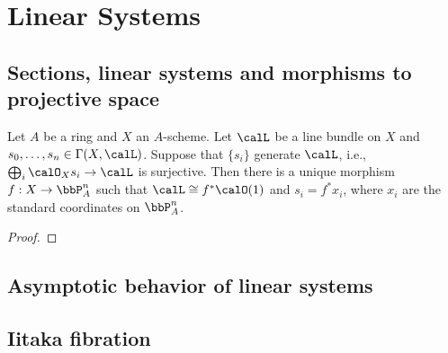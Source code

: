\section{Linear Systems}


\subsection{Sections, linear systems and morphisms to projective space}

    \begin{theorem}\label{thm:morphism_to_projective_space}
        Let \(A\) be a ring and \(X\) an \(A\)-scheme.
        Let \(\calL\) be a line bundle on \(X\) and \(s_0,\ldots,s_n\in\Gamma(X,\calL)\).
        Suppose that \(\{s_i\}\) generate \(\calL\), i.e., \(\bigoplus_i \calO_X s_i \to \calL\) is surjective.
        Then there is a unique morphism \(f:X\to \bbP^n_A\) such that \(\calL\cong f^*\calO(1)\) and \(s_i=f^*x_i\), where \(x_i\) are the standard coordinates on \(\bbP^n_A\).   
    \end{theorem}
    \begin{proof}
    \end{proof}


\subsection{Asymptotic behavior of linear systems}


\subsection{Iitaka fibration}